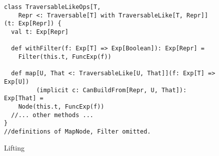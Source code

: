\begin{figure}
\begin{center}
\begin{lstlisting}
class TraversableLikeOps[T,
    Repr <: Traversable[T] with TraversableLike[T, Repr]](t: Exp[Repr]) {
  val t: Exp[Repr]

  def withFilter(f: Exp[T] => Exp[Boolean]): Exp[Repr] =
    Filter(this.t, FuncExp(f))

  def map[U, That <: TraversableLike[U, That]](f: Exp[T] => Exp[U])
         (implicit c: CanBuildFrom[Repr, U, That]): Exp[That] =
    Node(this.t, FuncExp(f))
  //... other methods ...
}
//definitions of MapNode, Filter omitted.
\end{lstlisting}
\end{center}
\caption{Lifting }
\label{fig:liftTrav}
\end{figure}

